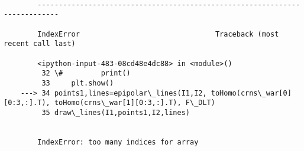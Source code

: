 \documentclass[11pt]{article}
\begin{document}
    \begin{Verbatim}[commandchars=\\\{\}]

        ---------------------------------------------------------------------------

        IndexError                                Traceback (most recent call last)

        <ipython-input-483-08cd48e4dc88> in <module>()
         32 \#         print()
         33     plt.show()
    ---> 34 points1,lines=epipolar\_lines(I1,I2, toHomo(crns\_war[0][0:3,:].T), toHomo(crns\_war[1][0:3,:].T), F\_DLT)
         35 draw\_lines(I1,points1,I2,lines)


        IndexError: too many indices for array

    \end{Verbatim}


    
    
    
    
\end{document}
